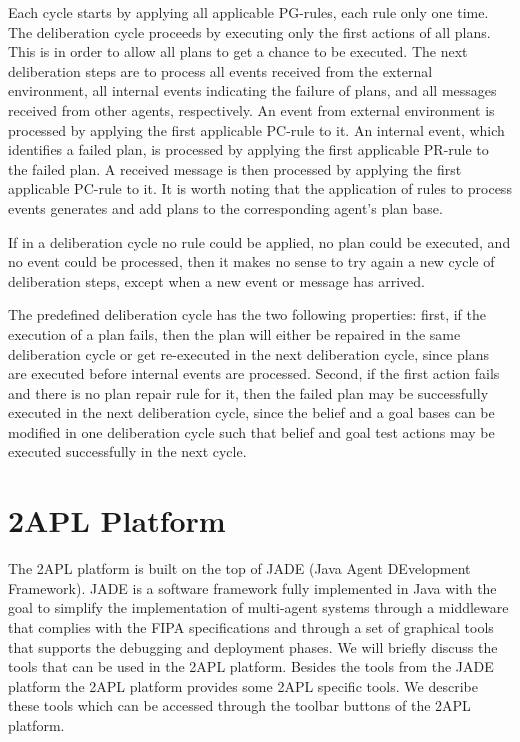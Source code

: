 \documentclass[a4paper]{article}
\begin{document}
Each cycle starts by applying all applicable PG-rules, each rule only one time. The deliberation cycle proceeds by executing only the first actions of all plans. This is in order to allow all plans to get a chance to be executed. The next deliberation steps are to
process all events received from the external environment, all internal events indicating the failure of plans, and all messages received from other agents, respectively. An event from external environment is processed by applying the first applicable PC-rule to it. An internal event, which identifies a failed plan, is processed by applying the first applicable PR-rule to the failed plan. A received message is then processed by applying the first applicable PC-rule to it. It is worth noting that the application of rules
to process events generates and add plans to the corresponding agent’s plan base.

If in a deliberation cycle no rule could be applied, no plan could be executed, and no event could be processed, then it makes no sense to try again a new cycle of deliberation steps, except when a new event or message has arrived.

The predefined deliberation cycle has the two following properties: first, if the execution of a plan fails, then the plan will either be repaired in the same deliberation cycle or get re-executed in the next deliberation cycle, since plans are executed before internal events are processed. Second, if the first action fails and there is no plan repair rule for it, then the failed plan may be successfully executed in the next deliberation cycle, since the belief and a goal bases can be modified in one deliberation cycle such that belief and goal test actions may be executed successfully in the next cycle.


\section{2APL Platform}\label{sec:platform} %

The 2APL platform is built on the top of JADE (Java Agent DEvelopment Framework). JADE is a software framework fully implemented in Java with the goal to simplify the implementation of multi-agent systems through a middleware that complies with the FIPA specifications and through a set of graphical tools that supports the debugging and deployment phases. We will briefly discuss the tools that can be used in the 2APL platform. Besides the tools from the JADE platform the 2APL platform provides some 2APL specific tools. We describe these tools which can be accessed through the toolbar buttons of the 2APL platform.
\end{document}
